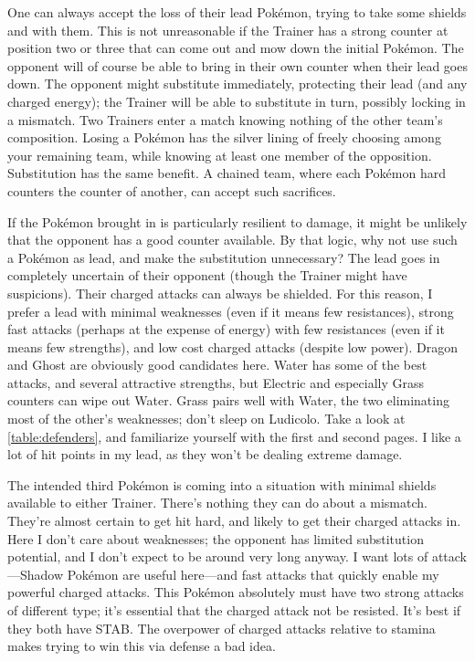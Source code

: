 One can always accept the loss of their lead Pokémon, trying to take some shields and \HP{} with them.
This is not unreasonable if the Trainer has a strong counter at position two or three
  that can come out and mow down the initial Pokémon.
The opponent will of course be able to bring in their own counter when their lead goes down.
The opponent might substitute immediately, protecting their lead (and any charged energy); the Trainer will be able to substitute in turn, possibly locking in a mismatch.
Two Trainers enter a match knowing nothing of the other team's composition.
Losing a Pokémon has the silver lining of freely choosing among your remaining team,
  while knowing at least one member of the opposition.
Substitution has the same benefit.
A chained team, where each Pokémon hard counters the counter of another, can accept such sacrifices.

If the Pokémon brought in is particularly resilient to damage, it might be unlikely that
 the opponent has a good counter available.
By that logic, why not use such a Pokémon as lead, and make the substitution unnecessary?
The lead goes in completely uncertain of their opponent (though the Trainer might have suspicions).
Their charged attacks can always be shielded.
For this reason, I prefer a lead with minimal weaknesses (even if it means few resistances),
 strong fast attacks (perhaps at the expense of energy) with few resistances (even if it means
 few strengths), and low cost charged attacks (despite low power). 
Dragon and Ghost are obviously good candidates here.
Water has some of the best attacks, and several attractive strengths, but Electric and
 especially Grass counters can wipe out Water.
Grass pairs well with Water, the two eliminating most of the other's weaknesses;
 don't sleep on Ludicolo.
Take a look at \autoref{table:defenders}, and familiarize yourself with the first
 and second pages.
I like a lot of hit points in my lead, as they won't be dealing extreme damage.

The intended third Pokémon is coming into a situation with minimal shields available
 to either Trainer.
There's nothing they can do about a mismatch.
They're almost certain to get hit hard, and likely to get their charged attacks in.
Here I don't care about weaknesses; the opponent has limited substitution potential,
 and I don't expect to be around very long anyway.
I want lots of attack---Shadow Pokémon are useful here---and fast attacks that quickly enable my powerful charged attacks.
This Pokémon absolutely must have two strong attacks of different type; it's essential that the charged attack not be resisted.
It's best if they both have STAB\@.
The overpower of charged attacks relative to stamina makes trying to win this via defense a bad idea.

